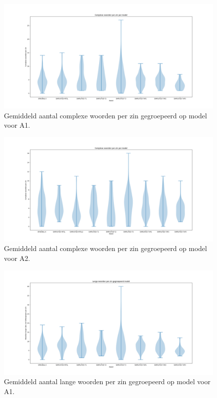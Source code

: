 \begin{figure}
	\includegraphics[width=\linewidth]{img/violinplot-complex-a1.png}
	\caption{Gemiddeld aantal complexe woorden per zin gegroepeerd op model voor A1.}
	\label{img:violinplot-complex-a1}
\end{figure}

\begin{figure}
	\includegraphics[width=\linewidth]{img/violinplot-complex-a2.png}
	\caption{Gemiddeld aantal complexe woorden per zin gegroepeerd op model voor A2.}
	\label{img:violinplot-complex-a2}
\end{figure}

\begin{figure}
	\includegraphics[width=\linewidth]{img/violinplot-long-a1.png}
	\caption{Gemiddeld aantal lange woorden per zin gegroepeerd op model voor A1.}
	\label{img:violinplot-long-a1}
\end{figure}

